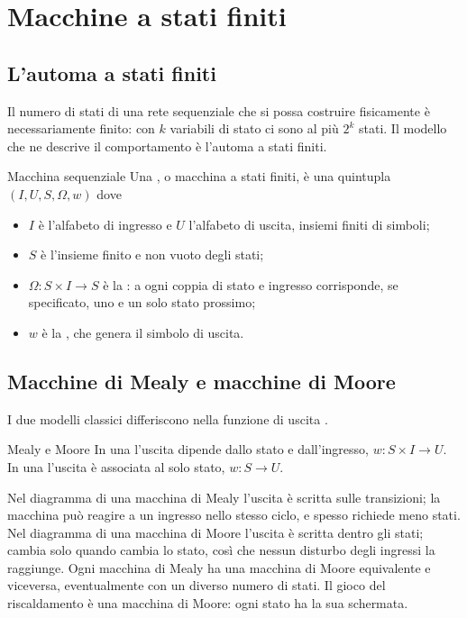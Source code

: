 \section{Macchine a stati finiti}

\subsection{L'automa a stati finiti}

Il numero di stati di una rete sequenziale che si possa costruire fisicamente è
necessariamente finito: con $k$ variabili di stato ci sono al più $2^{k}$
stati. Il modello che ne descrive il comportamento è l'automa a stati finiti.

\begin{definition}{Macchina sequenziale}
Una , o macchina a stati finiti, è una quintupla
$(I,U,S,\Omega,w)$ dove
\begin{itemize}[nosep]
\item $I$ è l'alfabeto di ingresso e $U$ l'alfabeto di uscita, insiemi finiti
  di simboli;
\item $S$ è l'insieme finito e non vuoto degli stati;
\item $\Omega: S\times I\to S$ è la : a ogni
  coppia di stato e ingresso corrisponde, se specificato, uno e un solo stato
  prossimo;
\item $w$ è la , che genera il simbolo di uscita.
\end{itemize}
\end{definition}

\subsection{Macchine di Mealy e macchine di Moore}

I due modelli classici differiscono nella funzione di uscita
\citep{mealy1955,moore1956}.

\begin{definition}{Mealy e Moore}
In una  l'uscita dipende dallo stato e dall'ingresso,
$w:S\times I\to U$. In una  l'uscita è associata al
solo stato, $w:S\to U$.
\end{definition}

Nel diagramma di una macchina di Mealy l'uscita è scritta sulle transizioni; la
macchina può reagire a un ingresso nello stesso ciclo, e spesso richiede meno
stati. Nel diagramma di una macchina di Moore l'uscita è scritta dentro gli
stati; cambia solo quando cambia lo stato, così che nessun disturbo degli
ingressi la raggiunge. Ogni macchina di Mealy ha una macchina di Moore
equivalente e viceversa, eventualmente con un diverso numero di stati. Il gioco
del riscaldamento è una macchina di Moore: ogni stato ha la sua schermata.

